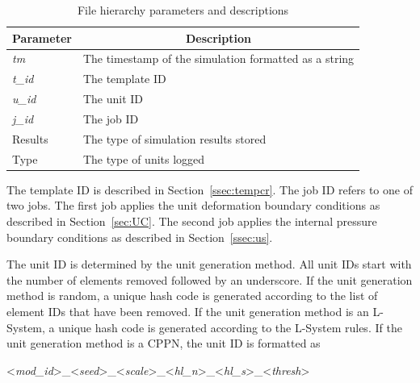 \begin{table}[H]
\centering
\caption[File hierarchy parameters]{File hierarchy parameters and descriptions}
\label{tab:fhpar}
\begin{tabular}{@{}ll@{}}
\toprule
\multicolumn{1}{c}{\textbf{Parameter}} & \multicolumn{1}{c}{\textbf{Description}}              \\ \midrule
\textit{tm}                            & The timestamp of the simulation formatted as a string \\
\textit{t\_id}                         & The template ID                                       \\
\textit{u\_id}                         & The unit ID                                           \\
\textit{j\_id}                         & The job ID                                            \\
Results                                & The type of simulation results stored                 \\
Type                                   & The type of units logged                              \\ \bottomrule
\end{tabular}
\end{table}

The template ID is described in Section~\ref{ssec:tempcr}. The job ID refers to one of two jobs. The first job applies the unit deformation boundary conditions as described in Section~\ref{sec:UC}. The second job applies the internal pressure boundary conditions as described in Section~\ref{ssec:us}.

The unit ID is determined by the unit generation method. All unit IDs start with the number of elements removed followed by an underscore. If the unit generation method is random, a unique hash code is generated according to the list of element IDs that have been removed. If the unit generation method is an L-System, a unique hash code is generated according to the L-System rules. If the unit generation method is a CPPN, the unit ID is formatted as

\vspace{\baselineskip}

\centerline{<\textit{mod\_id}>\_<\textit{seed}>\_<\textit{scale}>\_<\textit{hl\_n}>\_<\textit{hl\_s}>\_<\textit{thresh}>}

\vspace{\baselineskip}

